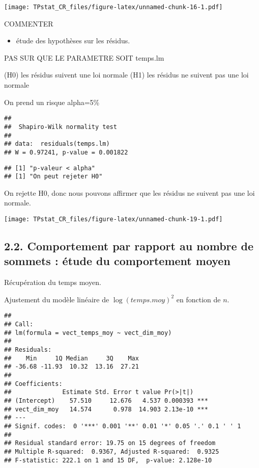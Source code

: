 \documentclass[]{article}
\providecommand{\tightlist}{%
  \setlength{\itemsep}{0pt}\setlength{\parskip}{0pt}}
\begin{document}
\texttt{[image: TPstat\_CR\_files/figure-latex/unnamed-chunk-16-1.pdf]}

COMMENTER

\begin{itemize}
\tightlist
\item
  étude des hypothèses sur les résidus.
\end{itemize}

PAS SUR QUE LE PARAMETRE SOIT temps.lm

(H0) les résidus suivent une loi normale (H1) les résidus ne suivent pas
une loi normale

On prend un risque alpha=5\%

\begin{verbatim}
## 
##  Shapiro-Wilk normality test
## 
## data:  residuals(temps.lm)
## W = 0.97241, p-value = 0.001822
\end{verbatim}

\begin{verbatim}
## [1] "p-valeur < alpha"
## [1] "On peut rejeter H0"
\end{verbatim}

On rejette H0, donc nous pouvons affirmer que les résidus ne suivent pas
une loi normale.

\texttt{[image: TPstat\_CR\_files/figure-latex/unnamed-chunk-19-1.pdf]}

\hypertarget{comportement-par-rapport-au-nombre-de-sommets-uxe9tude-du-comportement-moyen}{%
\subsection{2.2. Comportement par rapport au nombre de sommets : étude
du comportement
moyen}\label{comportement-par-rapport-au-nombre-de-sommets-uxe9tude-du-comportement-moyen}}

Récupération du temps moyen.

Ajustement du modèle linéaire de \(\log(temps.moy)^2\) en fonction de
\(n\).

\begin{verbatim}
## 
## Call:
## lm(formula = vect_temps_moy ~ vect_dim_moy)
## 
## Residuals:
##    Min     1Q Median     3Q    Max 
## -36.68 -11.93  10.32  13.16  27.21 
## 
## Coefficients:
##              Estimate Std. Error t value Pr(>|t|)    
## (Intercept)    57.510     12.676   4.537 0.000393 ***
## vect_dim_moy   14.574      0.978  14.903 2.13e-10 ***
## ---
## Signif. codes:  0 '***' 0.001 '**' 0.01 '*' 0.05 '.' 0.1 ' ' 1
## 
## Residual standard error: 19.75 on 15 degrees of freedom
## Multiple R-squared:  0.9367, Adjusted R-squared:  0.9325 
## F-statistic: 222.1 on 1 and 15 DF,  p-value: 2.128e-10
\end{verbatim}
\end{document}
